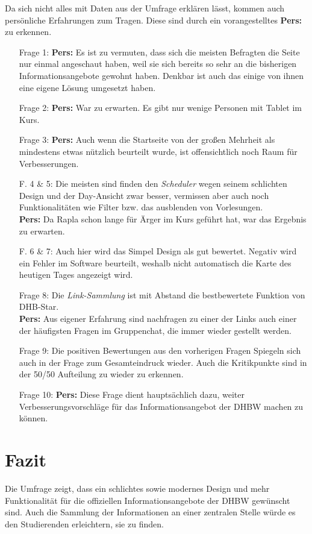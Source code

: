 Da sich nicht alles mit Daten aus der Umfrage erklären lässt, kommen auch persönliche Erfahrungen zum Tragen. Diese sind durch ein vorangestelltes \textbf{Pers:} zu erkennen. 

\begin{itemize}
\item[Frage 1:]
{\textbf{Pers:} Es ist zu vermuten, dass sich die meisten Befragten die Seite nur einmal angeschaut haben, weil sie sich bereits so sehr an die bisherigen Informationsangebote gewohnt haben. Denkbar ist auch das einige von ihnen eine eigene Lösung umgesetzt haben. }
\item[Frage 2:]
{\textbf{Pers:} War zu erwarten. Es gibt nur wenige Personen mit Tablet im Kurs. }
\item[Frage 3:]
{\textbf{Pers:} Auch wenn die Startseite von der großen Mehrheit als mindestens etwas nützlich beurteilt wurde, ist offensichtlich noch Raum für Verbesserungen.}
\item[F. 4 \& 5:]
{Die meisten sind finden den \emph{Scheduler} wegen seinem schlichten Design und der Day-Ansicht zwar besser, vermissen aber auch noch Funktionalitäten wie Filter bzw. das ausblenden von Vorlesungen. \\
	\textbf{Pers:} Da Rapla schon lange für Ärger im Kurs geführt hat, war das Ergebnis zu erwarten.}
\item[F. 6 \& 7:]
{Auch hier wird das Simpel Design als gut bewertet. Negativ wird ein Fehler im Software beurteilt, weshalb nicht automatisch die Karte des heutigen Tages angezeigt wird. }
\item [Frage 8:]
{Die \emph{Link-Sammlung} ist mit Abstand die bestbewertete Funktion von DHB-Star. \\
	\textbf{Pers:} Aus eigener Erfahrung sind nachfragen zu einer der Links auch einer der häufigsten Fragen im Gruppenchat, die immer wieder gestellt werden. }
\item [Frage 9:]
{Die positiven Bewertungen aus den vorherigen Fragen Spiegeln sich auch in der Frage zum Gesamteindruck wieder. Auch die Kritikpunkte sind in der 50/50 Aufteilung zu wieder zu erkennen. }
\item [Frage 10:]
{\textbf{Pers:} Diese Frage dient hauptsächlich dazu, weiter Verbesserungsvorschläge für das Informationsangebot der DHBW machen zu können. }
\end{itemize}

\section{Fazit}
Die Umfrage zeigt, dass ein schlichtes sowie modernes Design und mehr Funktionalität für die offiziellen Informationsangebote der DHBW gewünscht sind. Auch die Sammlung der Informationen an einer zentralen Stelle würde es den Studierenden erleichtern, sie zu finden.

